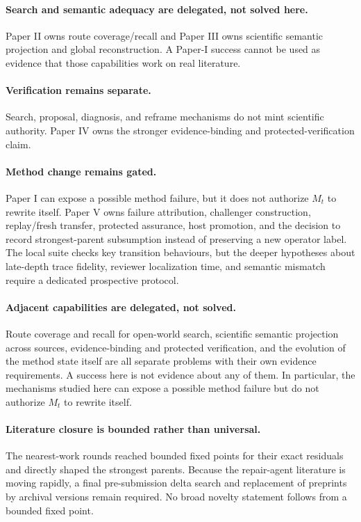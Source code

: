 \paragraph{Search and semantic adequacy are delegated, not solved here.}
Paper II owns route coverage/recall and Paper III owns scientific semantic projection and global reconstruction. A Paper-I success cannot be used as evidence that those capabilities work on real literature.

\paragraph{Verification remains separate.}
Search, proposal, diagnosis, and reframe mechanisms do not mint scientific authority. Paper IV owns the stronger evidence-binding and protected-verification claim.

\paragraph{Method change remains gated.}
Paper I can expose a possible method failure, but it does not authorize $M_t$ to rewrite itself. Paper V owns failure attribution, challenger construction, replay/fresh transfer, protected assurance, host promotion, and the decision to record strongest-parent subsumption instead of preserving a new operator label.
The local suite checks key transition behaviours, but the deeper hypotheses
about late-depth trace fidelity, reviewer localization time, and semantic
mismatch require a dedicated prospective protocol.

\paragraph{Adjacent capabilities are delegated, not solved.}
Route coverage and recall for open-world search, scientific semantic projection
across sources, evidence-binding and protected verification, and the evolution
of the method state itself are all separate problems with their own evidence
requirements. A success here is not evidence about any of them. In particular,
the mechanisms studied here can expose a possible method failure but do not
authorize $M_t$ to rewrite itself.

\paragraph{Literature closure is bounded rather than universal.}
The nearest-work rounds reached bounded fixed points for their exact residuals
and directly shaped the strongest parents. Because the repair-agent literature
is moving rapidly, a final pre-submission delta search and replacement of
preprints by archival versions remain required. No broad novelty statement
follows from a bounded fixed point.

